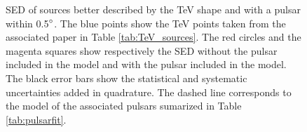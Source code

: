 \begin{figure}[h!]
\centering
{}
\caption{\label{fig:sedsourcespuls2}SED of sources better described by the TeV shape and with a pulsar within 0.5$\mbox{$^\circ$}$. The blue points show the TeV points taken from the associated paper in Table \ref{tab:TeV_sources}. The red circles and the magenta squares show respectively the SED without the pulsar included in the model and with the pulsar included in the model. The black error bars show the statistical and   systematic uncertainties added in quadrature. The dashed line corresponds to the model of the associated pulsars sumarized in Table \ref{tab:pulsarfit}.}
\end{figure}


